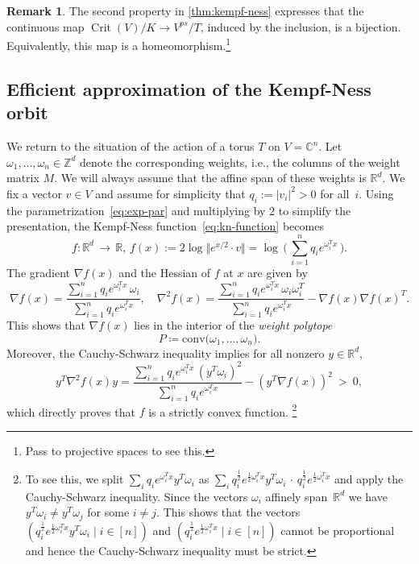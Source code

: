 \documentclass[10pt,a4paper]{article}
\theoremstyle{definition}
\newtheorem{remark}[theorem]{Remark}
\DeclareMathOperator{\Crit}{Crit}
\newcommand{\CC}{\mathbb{C}}
\newcommand{\ZZ}{\mathbb{Z}}
\newcommand{\RR}{\mathbb{R}}
\numberwithin{equation}{section}
\begin{document}
\begin{remark}
The second property in \cref{thm:kempf-ness} expresses that the continuous map $\Crit(V)/K \to V^{ps}/T$,
induced by the inclusion, is a bijection.
Equivalently,  this map is a homeomorphism.\footnote{Pass to projective spaces to see this.}
\end{remark}



\subsection{Efficient approximation of the Kempf-Ness orbit}\label{sec:EA-KN0}
We return to the situation of the action of a torus $T$ on $V=\CC^n$.
Let $\omega_1,\ldots,\omega_n\in\ZZ^d$ denote the corresponding weights,
i.e., the columns of the weight matrix $M$.
We will always assume that the affine span of these weights is $\RR^d$.
We fix a vector $v\in V$ and assume for simplicity that
$q_i := |v_i|^2 > 0$ for all~$i$.
Using the parametrization~\eqref{eq:exp-par} and multiplying by $2$ to simplify the presentation,
the Kempf-Ness function~\eqref{eq:kn-function} becomes
\begin{equation}\label{eq:def-kn-func}
	f \colon \RR^d \, \rightarrow \, \RR, \, f(x) := 2\log \Vert e^{x/2}\cdot v\Vert
   = \log\,\Big(\,\sum_{i=1}^n q_i e^{\omega_i^T x} \,\Big) .
\end{equation}
The gradient $\nabla f(x)$ and the Hessian of $f$ at $x$ are given by
\begin{equation}
\label{eq:grad-of-kn-func}
  \nabla f(x) = \frac{\sum_{i=1}^n q_i   e^{\omega_i^T x}\, \omega_i }{\sum_{i=1}^n q_i  e^{\omega_i^T x}}, \quad
 \nabla^2 f(x) = \frac{\sum_{i=1}^n q_i   e^{\omega_i^T x}\, \omega_i\omega_i^T }{\sum_{i=1}^n q_i  e^{\omega_i^T x} }
          - \nabla f(x) \nabla f(x)^T .
\end{equation}
This shows that $\nabla f(x)$ lies in the interior of the \textit{weight polytope}
\[
 P \coloneqq  \mathrm{conv}\big(\omega_1,\ldots,  \omega_n\big) .
\]
Moreover, the Cauchy-Schwarz inequality implies for all nonzero $y\in\RR^d$,
\begin{equation}\label{eq:yHyT}
 y^T\nabla^2 f(x) y= \frac{\sum_{i=1}^n q_i   e^{\omega_i^T x}\, (y^T\omega_i)^2 }{\sum_{i=1}^n q_i  e^{\omega_i^T x} }
          -  (y^T\nabla f(x))^2 \ >\  0 ,
\end{equation}
which directly proves that $f$ is a strictly convex function.%
\footnote{To see this, we split $\sum_i q_i e^{\omega_i^T x} y^T \omega_i$ as $\sum_i q_i^{\frac{1}{2}}e^{\frac{1}{2}\omega_i^T x}y^T \omega_i \, \cdot \, q_i^{\frac{1}{2}}e^{\frac{1}{2}\omega_i^T x}$ and apply the Cauchy-Schwarz inequality. Since the vectors $\omega_i$ affinely span~$\RR^d$ we have $y^T\omega_i\neq y^T\omega_j$ for some $i\neq j$.
This shows that the vectors $(q_i^{\frac{1}{2}}e^{\frac{1}{2}\omega_i^T x}y^T\omega_i\mid i\in [n])$ and $(q_i^{\frac{1}{2}}e^{\frac{1}{2}\omega_i^T x}\mid i\in [n])$ cannot be proportional and hence the Cauchy-Schwarz inequality must be strict.
}
\end{document}
